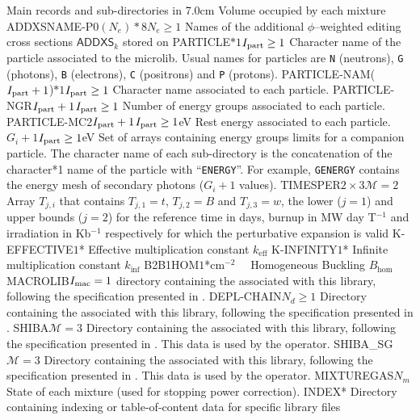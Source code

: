 \begin{DescriptionEnregistrement}{Main records and sub-directories in }{7.0cm}
  {Volume occupied by each mixture}
\OptCharEnr
  {ADDXSNAME-P0}{$(N_{e})*8$}{$N_{e}\ge 1$}
  {Names of the additional $\phi$--weighted editing cross sections $\mathsf{ADDXS}_{k}$ stored on }
\OptCharEnr
  {PARTICLE}{$*1$}{$I_{\rm part}\ge 1$} 
  {Character name of the particle associated to the microlib. Usual names for
  particles are {\tt N} (neutrons), {\tt G} (photons), {\tt B} (electrons),
  {\tt C} (positrons) and {\tt P} (protons).}
\OptCharEnr
  {PARTICLE-NAM}{($I_{\rm part}+1$)$*1$}{$I_{\rm part}\ge 1$} 
  {Character name associated to each particle.}
\OptIntEnr
  {PARTICLE-NGR}{$I_{\rm part}+1$}{$I_{\rm part}\ge 1$}
  {Number of energy groups associated to each particle.}
\OptRealEnr
  {PARTICLE-MC2}{$I_{\rm part}+1$}{$I_{\rm part}\ge 1$}{eV}
  {Rest energy associated to each particle.}
\OptRealVar
  {}{$G_i+1$}{$I_{\rm part}\ge 1$}{eV}
  {Set of arrays containing energy groups limits for a companion particle. The character name
  of each sub-directory is the concatenation of the character*1 name of the particle with ``{\tt ENERGY}''.
  For example, {\tt GENERGY} contains the energy mesh of secondary photons ($G_i+1$ values).}
\OptRealEnr
  {TIMESPER}{$2\times 3$}{$\mathcal{M}=2$}{}
  {Array $T_{j,i}$ that contains $T_{j,1}=t$, $T_{j,2}=B$ and $T_{j,3}=w$, the
   lower ($j=1$) and upper bounds ($j=2$) for the reference time in days, burnup
   in MW day T$^{-1}$ and irradiation in Kb$^{-1}$ respectively for which the
   perturbative expansion is valid}
\OptRealEnr
  {K-EFFECTIVE}{$1$}{*}{}
  {Effective multiplication constant $k_{\mathrm{eff}}$}
\OptRealEnr
  {K-INFINITY}{$1$}{*}{}
  {Infinite multiplication constant $k_{\mathrm{inf}}$}
\OptRealEnr
  {B2B1HOM}{$1$}{*}{cm$^{-2}$~~}
  {Homogeneous Buckling $B_{\mathrm{hom}}$}
\OptDirEnr
  {MACROLIB}{$I_{\rm mac} = 1$}
  {directory containing the  associated with this
  library, following the specification presented in .}
\OptDirEnr
  {DEPL-CHAIN}{$N_{d} \ge 1$}
  {Directory containing the  associated with this library, following
  the specification presented in .}
\OptDirEnr
  {SHIBA}{$\mathcal{M}=3$}
  {Directory containing the  associated with this
  library, following the specification presented in .
  This data is used by the  operator.}
\OptDirEnr
  {SHIBA\_SG}{$\mathcal{M}=3$}
  {Directory containing the  associated with this
  library, following the specification presented in .
  This data is used by the  operator.}
\IntEnr
  {MIXTUREGAS}{$N_{m}$}
  {State of each mixture (used for stopping power correction).}
\OptDirEnr
  {INDEX}{*}
  {Directory containing indexing or table-of-content data for specific library
  files}
\end{DescriptionEnregistrement}

